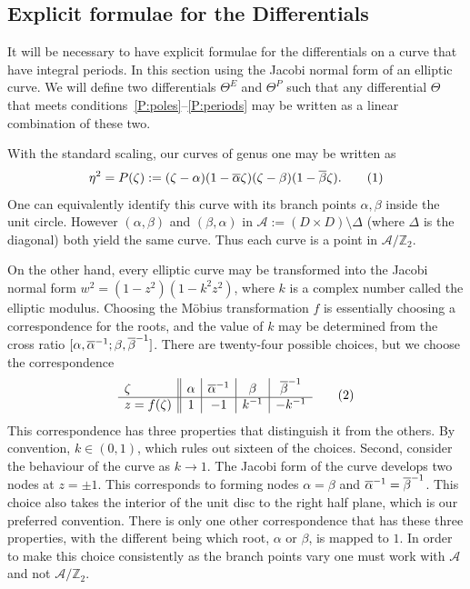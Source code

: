 \documentclass{article}
\begin{document}
\subsection{Explicit formulae for the Differentials}
\label{sec:Differentials}
It will be necessary to have explicit formulae for the differentials on a curve that have integral periods. In this section using the Jacobi normal form of an elliptic curve. We will define two differentials $\Theta^E$ and $\Theta^P$ such that any differential $\Theta$ that meets conditions~\ref{P:poles}--\ref{P:periods} may be written as a linear combination of these two.

With the standard scaling, our curves of genus one may be written as
\[
\eta^2 = P(\zeta) := (\zeta-\alpha)(1-\bar{\alpha}\zeta)(\zeta-\beta)(1-\bar{\beta}\zeta).
\labelthis{eqn:genus one curve}
\]
One can equivalently identify this curve with its branch points $\alpha,\beta$ inside the unit circle. However $(\alpha, \beta)$ and $(\beta,\alpha)$ in $\mathcal{A} := (D \times D) \setminus \Delta$ (where $\Delta$ is the diagonal) both yield the same curve. Thus each curve is a point in $\mathcal{A}/\mathbb{Z}_2$. 

On the other hand, every elliptic curve may be transformed into the Jacobi normal form $w^2 = (1-z^2)(1-k^2z^2)$, where $k$ is a complex number called the elliptic modulus. 
Choosing the M\"obius transformation $f$ is essentially choosing a correspondence for the roots, and the value of $k$ may be determined from the cross ratio $[\alpha,\overline{\alpha}^{-1};\beta,\overline{\beta}^{-1}]$.
There are twenty-four possible choices, but we choose the correspondence
\[
  \begin{array}{ l||c|c|c|c}
    \zeta & \alpha & \cji{\alpha} & \beta & \cji{\beta} \\
    \hline
    z = f(\zeta) & 1 & -1 & k^{-1} & -k^{-1}
  \end{array}
  \labelthis{eqn:choice f}
\]
This correspondence has three properties that distinguish it from the others. By convention, $k \in (0,1)$, which rules out sixteen of the choices. Second, consider the behaviour of the curve as $k\to 1$. The Jacobi form of the curve develops two nodes at $z=\pm 1$. This corresponds to forming nodes $\alpha=\beta$ and $\overline{\alpha}^{-1} = \overline{\beta}^{-1}$. This choice also takes the interior of the unit disc to the right half plane, which is our preferred convention. There is only one other correspondence that has these three properties, with the different being which root, $\alpha$ or $\beta$, is mapped to $1$. In order to make this choice consistently as the branch points vary one must work with $\mathcal{A}$ and not $\mathcal{A}/\mathbb{Z}_2$.
\end{document}
